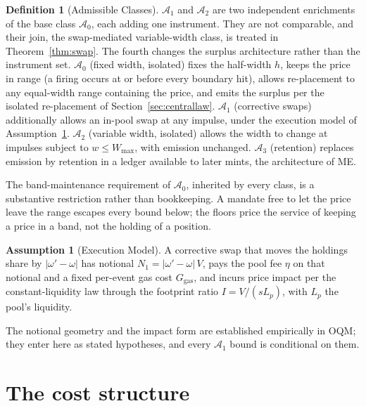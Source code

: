 \documentclass[11pt,a4paper]{article}
\theoremstyle{definition}
\newtheorem{definition}{Definition}
\newtheorem{assumption}{Assumption}
\theoremstyle{plain}
\theoremstyle{remark}
\begin{document}
\begin{definition}[Admissible Classes]\label{def:classes}
$\mathcal{A}_1$ and $\mathcal{A}_2$ are two independent enrichments of the base class $\mathcal{A}_0$, each adding one instrument. They are not comparable, and their join, the swap-mediated 
variable-width class, is treated in Theorem~\ref{thm:swap}. The fourth changes the surplus architecture rather than the instrument set. $\mathcal{A}_0$ (fixed width, isolated) fixes the 
half-width $h$, keeps the price in range (a firing occurs at or before every boundary hit), allows re-placement to any equal-width range containing the price, and emits the surplus per 
the isolated re-placement of Section~\ref{sec:centrallaw}. $\mathcal{A}_1$ (corrective swaps) additionally allows an in-pool swap at any impulse, under the execution model of 
Assumption~\ref{ass:execution}. $\mathcal{A}_2$ (variable width, isolated) allows the width to change at impulses subject to $w \le W_{\max}$, with emission unchanged. 
$\mathcal{A}_3$ (retention) replaces emission by retention in a ledger available to later mints, the architecture of ME.\cite{ryan2026master}
\end{definition}

The band-maintenance requirement of $\mathcal{A}_0$, inherited by every class, is a substantive restriction rather than bookkeeping. A mandate free to let the price leave the 
range escapes every bound below; the floors price the service of keeping a price in a band, not the holding of a position.

\begin{assumption}[Execution Model]\label{ass:execution}
A corrective swap that moves the holdings share by $|\omega' - \omega|$ has notional $N_1 = |\omega' - \omega|\,V$, pays the pool fee $\eta$ on that notional and a fixed per-event 
gas cost $G_{\mathrm{gas}}$, and incurs price impact per the constant-liquidity law through the footprint ratio $I = V/(s L_p)$, with $L_p$ the pool's liquidity.
\end{assumption}

The notional geometry and the impact form are established empirically in OQM;\cite{ryan2026omqm} they enter here as stated hypotheses, and every $\mathcal{A}_1$ bound is conditional on them.

\section{The cost structure}\label{sec:cost}
\end{document}
